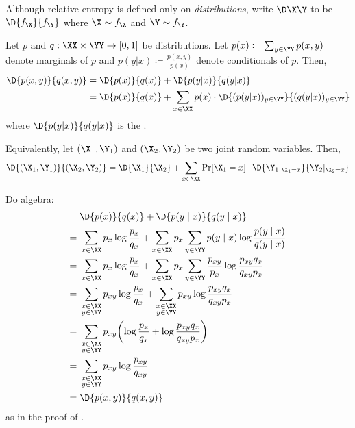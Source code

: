 \documentclass[class=co432,notes,tikz]{agony}
\begin{document}
\begin{notation}
  Although relative entropy is defined only on \emph{distributions},
  write $\D\X\Y$ to be $\D{f_{\X}}{f_{\Y}}$
  where $\X \sim f_{\X}$ and $\Y \sim f_{\Y}$.
\end{notation}

\begin{theorem}\label{thm:chainD}
  Let $p$ and $q : \XX\times\YY \to [0,1]$ be distributions.
  Let $p(x) \coloneqq \sum_{y\in\YY} p(x,y)$ denote marginals of $p$
  and $p(y|x) \coloneqq \frac{p(x,y)}{p(x)}$ denote conditionals of $p$.
  Then,
  \begin{align*}
    \D{p(x,y)}{q(x,y)}
     & = \D{p(x)}{q(x)} + \D{p(y|x)}{q(y|x)}                                                   \\
     & = \D{p(x)}{q(x)} + \sum_{x\in\XX} p(x) \cdot \D{(p(y|x))_{y\in\YY}}{(q(y|x))_{y\in\YY}}
  \end{align*}
  where $\D{p(y|x)}{q(y|x)}$
  is the .

  Equivalently, let $(\X_1,\Y_1)$ and $(\X_2,\Y_2)$ be two joint random variables.
  Then,
  \[
    \D{(\X_1,\Y_1)}{(\X_2,\Y_2)}
    = \D{\X_1}{\X_2} + \sum_{x\in\XX}\Pr[\X_1=x]\cdot\D{\Y_1|_{\X_1=x}}{\Y_2|_{\X_2=x}}
  \]
\end{theorem}
\begin{prf}
  Do algebra:
  \begin{align*}
        & \D{p(x)}{q(x)} + \D{p(y \mid x)}{q(y \mid x)}                                                                                                \\
    ={} & \sum_{x\in\XX} p_x \log \frac{p_x}{q_x} + \sum_{x\in\XX}p_x\sum_{y\in\YY}p(y\mid x) \log\frac{p(y\mid x)}{q(y\mid x)}                        \\
    ={} & \sum_{x\in\XX} p_x \log \frac{p_x}{q_x} + \sum_{x\in\XX}p_x\sum_{y\in\YY}\frac{p_{xy}}{p_x} \log\frac{p_{xy}q_x}{q_{xy}p_x}                  \\
    ={} & \sum_{\substack{x\in\XX\br y\in\YY}} p_{xy} \log \frac{p_x}{q_x} + \sum_{\substack{x\in\XX\br y\in\YY}}p_{xy}\log\frac{p_{xy}q_x}{q_{xy}p_x} \\
    ={} & \sum_{\substack{x\in\XX\br y\in\YY}} p_{xy} \qty(\log \frac{p_x}{q_x} + \log\frac{p_{xy}q_x}{q_{xy}p_x})                                     \\
    ={} & \sum_{\substack{x\in\XX\br y\in\YY}} p_{xy} \log\frac{p_{xy}}{q_{xy}}                                                                        \\
    ={} & \D{p(x,y)}{q(x,y)}
  \end{align*}
  as in the proof of .
\end{prf}
\end{document}
